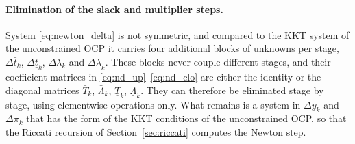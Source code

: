 \paragraph{Elimination of the slack and multiplier steps.}
System \eqref{eq:newton_delta} is not symmetric, and compared to the KKT system of the unconstrained OCP it carries four additional blocks of unknowns per stage, $\Delta\bar{t}_k$, $\Delta\underline{t}_k$, $\Delta\bar{\lambda}_k$ and $\Delta\underline{\lambda}_k$.
These blocks never couple different stages, and their coefficient matrices in \eqref{eq:nd_up}--\eqref{eq:nd_clo} are either the identity or the diagonal matrices $\bar{T}_k$, $\bar{\Lambda}_k$, $\underline{T}_k$, $\underline{\Lambda}_k$.
They can therefore be eliminated stage by stage, using elementwise operations only.
What remains is a system in $\Delta y_k$ and $\Delta\pi_k$ that has the form of the KKT conditions of the unconstrained OCP, so that the Riccati recursion of Section~\ref{sec:riccati} computes the Newton step.

